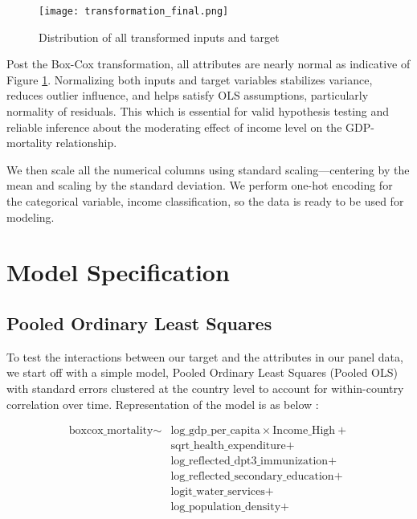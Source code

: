 \documentclass[10pt,a4paper]{article}
\begin{document}
    \begin{figure}[H]
    	\centering
    	\texttt{[image: transformation\_final.png]}
    	\caption{Distribution of all transformed inputs and target}
    	\label{fig:post_transformation}
    \end{figure}

Post the Box-Cox transformation, all attributes are nearly normal as indicative of Figure \ref{fig:post_transformation}.
Normalizing both inputs and target variables stabilizes variance, reduces outlier influence, and helps satisfy OLS assumptions, particularly normality of residuals. This which is essential for valid hypothesis testing and reliable inference about the moderating effect of income level on the GDP-mortality relationship.

We then scale all the numerical columns using standard scaling—centering by the mean and scaling by the standard deviation.
We perform one-hot encoding for the categorical variable, income classification, so the data is ready to be used for modeling.

\section{Model Specification}

\subsection{Pooled Ordinary Least Squares}
   To test the interactions between our target and the attributes in our panel data, we start off with a simple model, Pooled Ordinary Least Squares (Pooled OLS) with standard errors clustered at the country level to account for within-country correlation over time. Representation of the model is as below :

    \begin{equation}
    \begin{split}
    \text{boxcox\_mortality} \sim & \text{log\_gdp\_per\_capita} \times \text{Income\_High} + \\
    & \text{sqrt\_health\_expenditure} + \\
    & \text{log\_reflected\_dpt3\_immunization} + \\
    & \text{log\_reflected\_secondary\_education} + \\
    & \text{logit\_water\_services} + \\
    & \text{log\_population\_density} + \\
    \end{split}
    \end{equation}
\end{document}
